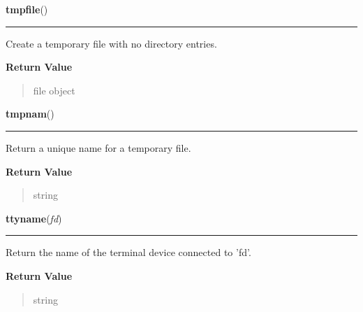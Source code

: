 \hspace{.8\funcindent}\begin{boxedminipage}{\funcwidth}

    \raggedright \textbf{tmpfile}()

    \vspace{-1.5ex}

    \rule{\textwidth}{0.5\fboxrule}
\setlength{\parskip}{2ex}
    Create a temporary file with no directory entries.

\setlength{\parskip}{1ex}
      \textbf{Return Value}
    \vspace{-1ex}

      \begin{quote}
      file object

      \end{quote}

    \end{boxedminipage}

    \label{os:tmpnam}

    \vspace{0.5ex}

\hspace{.8\funcindent}\begin{boxedminipage}{\funcwidth}

    \raggedright \textbf{tmpnam}()

    \vspace{-1.5ex}

    \rule{\textwidth}{0.5\fboxrule}
\setlength{\parskip}{2ex}
    Return a unique name for a temporary file.

\setlength{\parskip}{1ex}
      \textbf{Return Value}
    \vspace{-1ex}

      \begin{quote}
      string

      \end{quote}

    \end{boxedminipage}

    \label{os:ttyname}

    \vspace{0.5ex}

\hspace{.8\funcindent}\begin{boxedminipage}{\funcwidth}

    \raggedright \textbf{ttyname}(\textit{fd})

    \vspace{-1.5ex}

    \rule{\textwidth}{0.5\fboxrule}
\setlength{\parskip}{2ex}
    Return the name of the terminal device connected to 'fd'.

\setlength{\parskip}{1ex}
      \textbf{Return Value}
    \vspace{-1ex}

      \begin{quote}
      string

      \end{quote}

    \end{boxedminipage}

